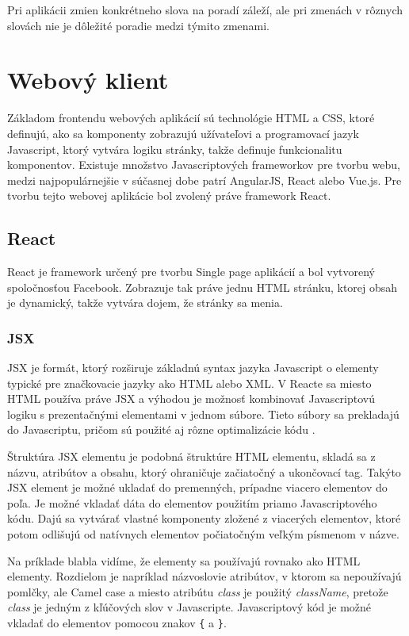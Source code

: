 \documentclass[
  digital, %
  table,   %
  lof,     %
  lot,     %
]{fithesis3}
\begin{document}
Pri aplikácii zmien konkrétneho slova na poradí záleží, ale pri zmenách v rôznych slovách nie je dôležité poradie medzi týmito zmenami.





\chapter{Webový klient}
Základom frontendu webových aplikácií sú technológie HTML a CSS, ktoré definujú, ako sa komponenty zobrazujú užívateľovi a programovací jazyk Javascript, ktorý vytvára logiku stránky, takže definuje funkcionalitu komponentov. Existuje množstvo Javascriptových frameworkov pre tvorbu webu, medzi najpopulárnejšie v súčasnej dobe patrí AngularJS, React alebo Vue.js. Pre tvorbu tejto webovej aplikácie bol zvolený práve framework React.

\section{React}
React je framework určený pre tvorbu Single page aplikácií a bol vytvorený spoločnosťou Facebook. Zobrazuje tak práve jednu HTML stránku, ktorej obsah je dynamický, takže vytvára dojem, že stránky sa menia.

\subsection{JSX}
JSX je formát, ktorý rozširuje základnú syntax jazyka Javascript o elementy typické pre značkovacie jazyky ako HTML alebo XML. V Reacte sa miesto HTML používa práve JSX a výhodou je možnosť kombinovať Javascriptovú logiku s prezentačnými elementami v jednom súbore. Tieto súbory sa prekladajú do Javascriptu, pričom sú použité aj rôzne optimalizácie kódu \parencite{gackenheimer2015react}.

Štruktúra JSX elementu je podobná štruktúre HTML elementu, skladá sa z názvu, atribútov a obsahu, ktorý ohraničuje začiatočný a ukončovací tag. Takýto JSX element je možné ukladať do premenných, prípadne viacero elementov do poľa. Je možné vkladať dáta do elementov použitím priamo Javascriptového kódu. Dajú sa vytvárať vlastné komponenty zložené z viacerých elementov, ktoré potom odlišujú od natívnych elementov počiatočným veľkým písmenom v názve.

Na príklade blabla vidíme, že elementy sa používajú rovnako ako HTML elementy. Rozdielom je napríklad názvoslovie atribútov, v ktorom sa nepoužívajú pomlčky, ale Camel case a miesto atribútu \textit{class} je použitý \textit{className}, pretože \textit{class} je jedným z kľúčových slov v Javascripte. Javascriptový kód je možné vkladať do elementov pomocou znakov \texttt{\{} a \texttt{\}}.
\end{document}
